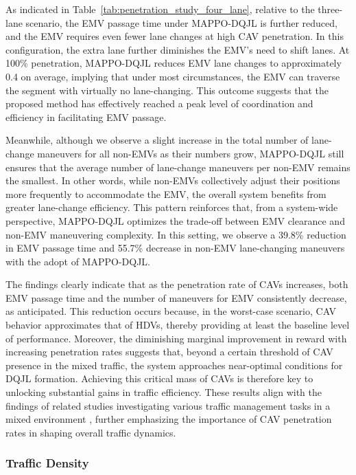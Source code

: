 As indicated in Table~\ref{tab:penetration_study_four_lane}, relative to the three-lane scenario, the EMV passage time under MAPPO-DQJL is further reduced, and the EMV requires even fewer lane changes at high CAV penetration. In this configuration, the extra lane further diminishes the EMV’s need to shift lanes. At 100\% penetration, MAPPO-DQJL reduces EMV lane changes to approximately 0.4 on average, implying that under most circumstances, the EMV can traverse the segment with virtually no lane-changing. This outcome suggests that the proposed method has effectively reached a peak level of coordination and efficiency in facilitating EMV passage.

Meanwhile, although we observe a slight increase in the total number of lane-change maneuvers for all non-EMVs as their numbers grow, MAPPO-DQJL still ensures that the average number of lane-change maneuvers per non-EMV remains the smallest. In other words, while non-EMVs collectively adjust their positions more frequently to accommodate the EMV, the overall system benefits from greater lane-change efficiency. This pattern reinforces that, from a system-wide perspective, MAPPO-DQJL optimizes the trade-off between EMV clearance and non-EMV maneuvering complexity. In this setting, we observe a 39.8\% reduction in EMV passage time and 55.7\% decrease in non-EMV lane-changing maneuvers with the adopt of MAPPO-DQJL.

The findings clearly indicate that as the penetration rate of CAVs increases, both EMV passage time and the number of maneuvers for EMV consistently decrease, as anticipated. This reduction occurs because, in the worst-case scenario, CAV behavior approximates that of HDVs, thereby providing at least the baseline level of performance. Moreover, the diminishing marginal improvement in reward with increasing penetration rates suggests that, beyond a certain threshold of CAV presence in the mixed traffic, the system approaches near-optimal conditions for DQJL formation. Achieving this critical mass of CAVs is therefore key to unlocking substantial gains in traffic efficiency. These results align with the findings of related studies investigating various traffic management tasks in a mixed environment \cite{wu2017flow,Houshmand2019Penetration,ding2020penetration,argote2015connected,du2017coordination,khondaker2015variable}, further emphasizing the importance of CAV penetration rates in shaping overall traffic dynamics.

\subsubsection{Traffic Density}
